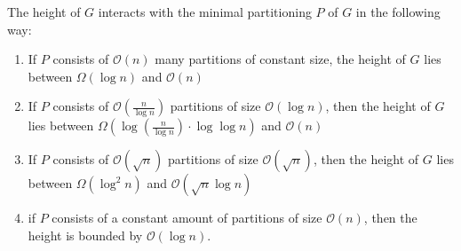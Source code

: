 \begin{lemma}\label{l:partition_binary_tree_lower_upper_bounds}
	The height of $G$ interacts with the minimal partitioning $P$ of $G$ in the following way:
	\begin{enumerate}
		\item If $P$ consists of $\mathcal{O}(n)$ many partitions of constant size, the height of $G$ lies between $\Omega(\log n)$ and $\mathcal{O}(n)$
		\item If $P$ consists of $\mathcal{O}\left(\frac{n}{\log n}\right)$ partitions of size $\mathcal{O}(\log n)$, then the height of $G$ lies between $\Omega\left(\log\left(\frac{n}{\log n}\right)\cdot \log \log n \right)$ and $\mathcal{O}\left( n\right)$
		\item If $P$ consists of $\mathcal{O}(\sqrt{n})$ partitions of size $\mathcal{O}(\sqrt{n})$, then the height of $G$ lies between $\Omega(\log^2 n)$ and $\mathcal{O}(\sqrt{n}\log n)$
		\item if $P$ consists of a constant amount of partitions of size $\mathcal{O}(n)$, then the height is bounded by $\mathcal{O}(\log n)$.
	\end{enumerate}
\end{lemma}
